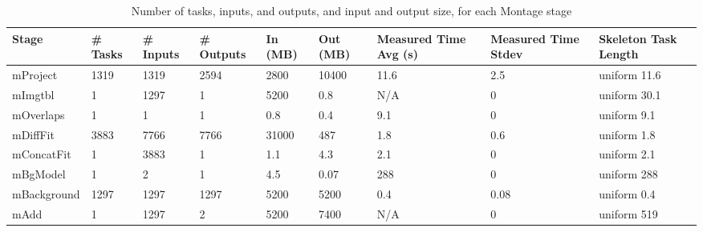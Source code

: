 \documentclass[preprint,12pt]{elsarticle}
\newcommand{\zhaonote}[1]{{\textcolor{darkgreen}{ ***Zhao:  #1 }}}
\newcommand{\zhaonote}[1]{}
\begin{document}

\begin{table}[ht]
\begin{center}
    \caption{Number of tasks, inputs, and outputs, and input and output size, for each Montage stage}
    \begin{scriptsize}
    \begin{tabular}{ | p{1.65cm} | p{0.6cm} | p{0.65cm} | p{0.75cm} | p{0.85cm} | p{0.85cm} | p{1.2cm} | p{1.3cm} | p{1.7cm} |}
    \hline
    Stage & \# Tasks & \# Inputs & \# Outputs & In (MB) & Out (MB) & Measured Time Avg (s) & Measured Time Stdev & Skeleton Task Length\\ \hline \hline
	mProject    & 1319 & 1319 & 2594 &  2800 & 10400 & 11.6 &  2.5 & uniform 11.6\\ \hline
	mImgtbl     &    1 & 1297 &    1 &  5200 &   0.8 &  N/A &    0 & uniform 30.1\\ \hline
	mOverlaps   &    1 &    1 &    1 &   0.8 &   0.4 &  9.1 &    0 & uniform  9.1\\ \hline
	mDiffFit    & 3883 & 7766 & 7766 & 31000 &   487 &  1.8 &  0.6 & uniform  1.8\\ \hline
	mConcatFit  &    1 & 3883 &    1 &   1.1 &   4.3 &  2.1 &    0 & uniform  2.1\\ \hline
	mBgModel    &    1 &    2 &    1 &   4.5 &  0.07 &  288 &    0 & uniform  288\\ \hline
	mBackground & 1297 & 1297 & 1297 &  5200 &  5200 &  0.4 & 0.08 & uniform  0.4\\ \hline
	mAdd        &    1 & 1297 &    2 &  5200 &  7400 &  N/A &    0 & uniform  519\\ \hline
    \end{tabular}
    \end{scriptsize}
    \label{tb:montage-stats}
\end{center}   
\end{table} 
\end{document}
